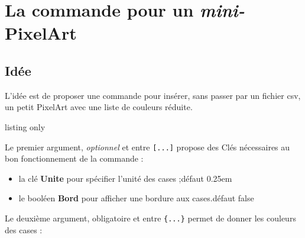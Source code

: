 \documentclass{article}
\newcommand\Cle[1]{{\bfseries\sffamily\textlangle #1\textrangle}}
\begin{document}
\pagebreak

\begin{PresentationCode}{}
\end{PresentationCode}

\newpage

\section{La commande pour un \textit{mini-}PixelArt}

\subsection{Idée}

L'idée est de proposer une commande pour insérer, sans passer par un fichier \textsf{csv}, un petit PixelArt avec une liste de couleurs réduite.

\begin{PresentationCode}{listing only}
\end{PresentationCode}

Le premier argument, \textit{optionnel} et entre \texttt{[...]} propose des \textsf{Clés} nécessaires au bon fonctionnement de la commande :

\begin{itemize}
	\item la clé \Cle{Unite} pour spécifier l'unité des cases ;\hfill{}défaut \textsf{0.25em}
	\item le booléen \Cle{Bord} pour afficher une bordure aux cases.\hfill{}défaut \textsf{false}
\end{itemize}

Le deuxième argument, obligatoire et entre \texttt{\{...\}} permet de donner les couleurs des cases :
\end{document}
